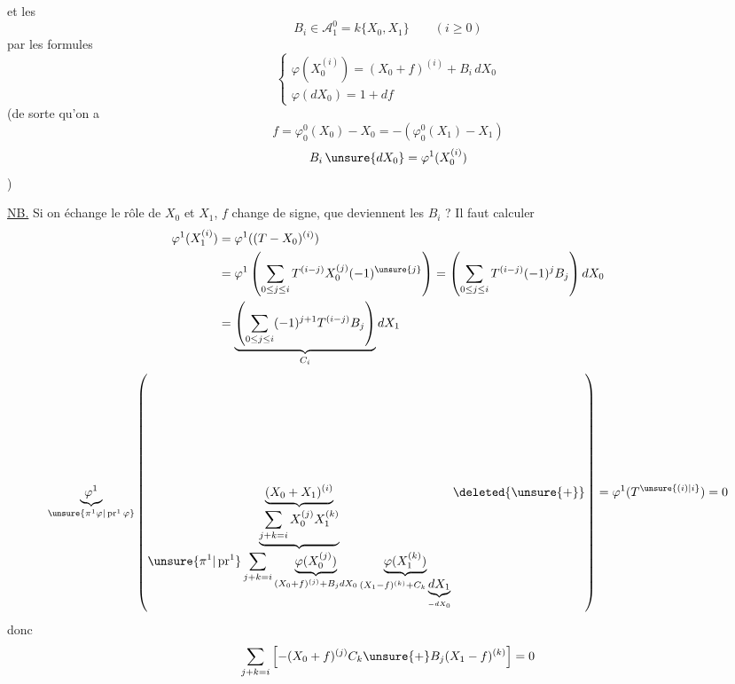 et les
\[
\boxed{B_i\in\mathcal A_1^0=k\{X_0,X_1\}\qquad(i\ge0)}
\]
par les formules
\[
\begin{cases}
\varphi(X_0^{(i)})=(X_0+f)^{(i)}+B_i\,dX_0\\
\varphi(dX_0)=1+df
\end{cases}
\]
(de sorte qu'on a
\[
f=\varphi_0^0(X_0)-X_0=-(\varphi_0^0(X_1)-X_1)
\]
\[
B_i\,\unsure{dX_0}=\varphi^1(X_0^{(i)})
\]
)

\uline{NB.} Si on échange le rôle de $X_0$ et $X_1$, $f$ change de signe, que deviennent les $B_i$ ? Il faut calculer
\[
\begin{aligned}
\varphi^1(X_1^{(i)})&=\varphi^1((T-X_0)^{(i)})\\
&=\varphi^1\left(\sum_{0\le j\le i}T^{(i-j)}X_0^{(j)}(-1)^{\unsure{j}}\right)
=\left(\sum_{0\le j\le i}T^{(i-j)}(-1)^jB_j\right)dX_0\\
&=\underbrace{\left(\sum_{0\le j\le i}(-1)^{j+1}T^{(i-j)}B_j\right)}_{C_i}dX_1
\end{aligned}
\]
\[
\underbrace{\varphi^1}_{\unsure{\pi^1\varphi|\operatorname{pr}^1\varphi}}
\left(
\underbrace{(X_0+X_1)^{(i)}}_{
\underbrace{\displaystyle\sum_{j+k=i}X_0^{(j)}X_1^{(k)}}_{
\displaystyle\unsure{\pi^1|\operatorname{pr}^1}\sum_{j+k=i}
\underbrace{\varphi(X_0^{(j)})}_{(X_0+f)^{(j)}+B_jdX_0}
\underbrace{\varphi(X_1^{(k)})}_{(X_1-f)^{(k)}+C_k\underbrace{dX_1}_{-dX_0}}
}}
\deleted{\unsure{+}}
\right)=\varphi^1(T^{\unsure{(i)|i}})=0
\]
donc
\[
\sum_{j+k=i}\left[-(X_0+f)^{(j)}C_k\unsure{+}B_j(X_1-f)^{(k)}\right]=0
\]
